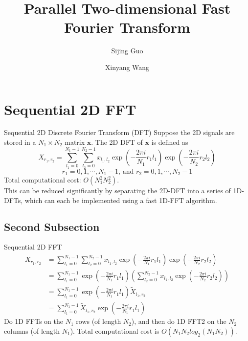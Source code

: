 \documentclass{beamer}
\title{Parallel Two-dimensional Fast Fourier Transform}
\author{Sijing Guo \and Xinyang Wang}
\institute[Courant Institute of Mathematical Sciences] %
{
Courant Institute of Mathematical Sciences
\and Final Project of High Performace Computing}
\begin{document}
\begin{frame}
  \titlepage
\end{frame}


\section{Sequential 2D FFT}


\begin{frame}{Sequential 2D Discrete Fourier Transform (DFT)}
Suppose the 2D signals are stored in a $N_1\times N_2$ matrix $\textbf{x}$. The 2D DFT of $\textbf{x}$ is defined as 
$$X_{r_1,r_2}=\sum_{l_1=0}^{N_1-1}\sum_{l_2=0}^{N_2-1}x_{l_1,l_2}\exp({-\frac{2\pi i}{N_1}r_1l_1})\exp({-\frac{2\pi i}{N_2}r_2l_2})$$
$$r_1=0,1,\cdots, N_1-1 \text{, and } r_2=0,1,\cdots,N_2-1$$
Total computational cost: $O(N_1^2N_2^2)$.\\
\vspace{0.5cm}
This can be reduced significantly by separating the 2D-DFT into a series of 1D-DFTs, which can each be implemented using a fast 1D-FFT algorithm.
\end{frame}

\subsection{Second Subsection}

\begin{frame}{Sequential 2D FFT}
\vspace{-1cm}
\begin{align*}
X_{r_1,r_2}&=\sum_{l_1=0}^{N_1-1}\sum_{l_2=0}^{N_2-1}x_{l_1,l_2}\exp({-\frac{2\pi i}{N_1}r_1l_1})\exp({-\frac{2\pi i}{N_2}r_2l_2})\\
&=\sum_{l_1=0}^{N_1-1}\exp({-\frac{2\pi i}{N_1}r_1l_1})\left(\sum_{l_2=0}^{N_2-1}x_{l_1,l_2}\exp({-\frac{2\pi i}{N_2}r_2l_2})\right)\\
&= \sum_{l_1=0}^{N_1-1}\exp({-\frac{2\pi i}{N_1}r_1l_1})\tilde{X}_{l_1,r_2}\\
&=\sum_{l_1=0}^{N_1-1}\tilde{X}_{l_1,r_2}\exp({-\frac{2\pi i}{N_1}r_1l_1})
\end{align*}
Do 1D FFTs on the $N_1$ rows (of length $N_2$), and then do 1D FFT2 on the $N_2$ columns (of length $N_1$). Total computational cost is  $O(N_1N_2log_2(N_1N_2))$.
\end{frame}
\end{document}
